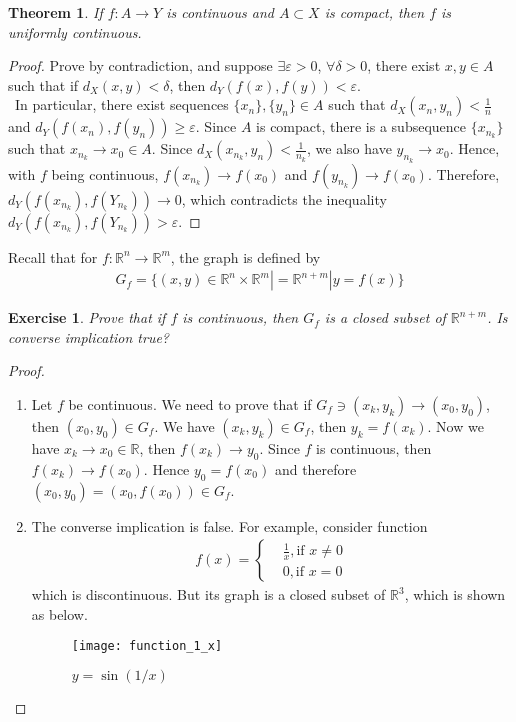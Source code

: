 \documentclass[12pt,leqno]{amsart}
\newtheorem{theorem}{Theorem}[section]
\newtheorem{exercise}{Exercise}[section]
\theoremstyle{definition}
\numberwithin{equation}{subsection}
\begin{document}
\medskip

\begin{theorem}
If $f:A\to Y$ is continuous and $A\subset X$ is compact, then $f$ is uniformly continuous.
\end{theorem}
\begin{proof}
Prove by contradiction, and suppose $\exists\varepsilon > 0$, $\forall \delta > 0$, there exist $x,y\in A$ such that if $d_X(x,y)<\delta$, then $d_Y(f(x),f(y)) < \varepsilon$. \\
\hspace*{1em}\, In particular, there exist sequences $\{x_n\}, \{y_n\}\in A$ such that $d_X(x_n,y_n) < \frac{1}{n}$ and $d_Y(f(x_n),f(y_n))\geq \varepsilon$. Since $A$ is compact, there is a subsequence $\{x_{n_k}\}$ such that $x_{n_k}\to x_0\in A$. Since $d_X(x_{n_k},y_n) < \frac{1}{n_k}$, we also have $y_{n_k}\to x_0$. Hence, with $f$ being continuous, $f(x_{n_k})\to f(x_0)$ and $f(y_{n_k})\to f(x_0)$. Therefore, $d_Y(f(x_{n_k}),f(Y_{n_k}))\to 0$, which contradicts the inequality $d_Y(f(x_{n_k}),f(Y_{n_k})) > \varepsilon$.
\end{proof}

\medskip

Recall that for $f:\mathbb{R}^n\to\mathbb{R}^m$, the graph is defined by
\begin{align*}
    G_f = \{(x,y)\in \mathbb{R}^n\times \mathbb{R}^m|= \mathbb{R}^{n+m}| y = f(x)\}
\end{align*}

\begin{exercise}
Prove that if $f$ is continuous, then $G_f$ is a closed subset of $\mathbb{R}^{n+m}$. Is converse implication true? 
\end{exercise}
\begin{proof}
~\begin{enumerate}
    \item Let $f$ be continuous. We need to prove that if $G_f\ni (x_k,y_k)\to (x_0,y_0)$, then $(x_0,y_0)\in G_f$. We have $(x_k,y_k)\in G_f$, then $y_k = f(x_k)$. Now we have $x_k\to x_0\in \mathbb{R}$, then $f(x_k)\to y_0$. Since $f$ is continuous, then $f(x_k)\to f(x_0)$. Hence $y_0 = f(x_0)$ and therefore $(x_0,y_0) = (x_0, f(x_0)) \in G_f$.
    \item The converse implication is false. For example, consider function 
    \begin{align*}
        f(x) = \left\{
        \begin{aligned}
        & \frac{1}{x}, \text{if}\,\, x \neq 0 \\
        & 0, \text{if}\,\, x = 0
        \end{aligned}
        \right.
    \end{align*}
    which is discontinuous. But its graph is a closed subset of $\mathbb{R}^3$, which is shown as below.
    \begin{figure}[h]
        \centering
        \texttt{[image: function\_1\_x]}
        \caption{$y = \sin(1/x)$}
        \label{fig:function_1_x}
    \end{figure}
\end{enumerate}
\end{proof}
\end{document}
